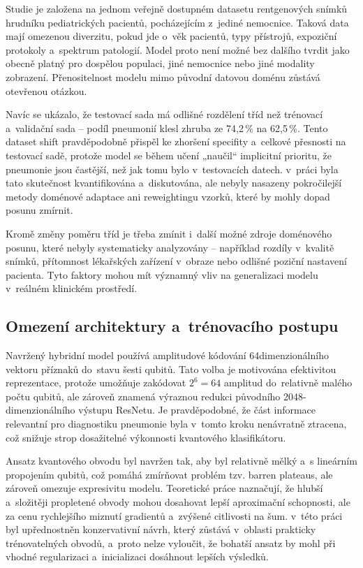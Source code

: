 \documentclass[12pt, a4paper]{report}
\begin{document}
Studie je založena na jednom veřejně dostupném datasetu rentgenových snímků hrudníku pediatrických pacientů, pocházejícím z~jediné nemocnice. Taková data mají omezenou diverzitu, pokud jde o~věk pacientů, typy přístrojů, expoziční protokoly a~spektrum patologií. Model proto není možné bez dalšího tvrdit jako obecně platný pro dospělou populaci, jiné nemocnice nebo jiné modality zobrazení. Přenositelnost modelu mimo původní datovou doménu zůstává otevřenou otázkou.

Navíc se ukázalo, že testovací sada má odlišné rozdělení tříd než trénovací a~validační sada – podíl pneumonií klesl zhruba ze 74{,}2\,\% na 62{,}5\,\%. Tento dataset shift pravděpodobně přispěl ke zhoršení specifity a~celkové přesnosti na testovací sadě, protože model se během učení „naučil“ implicitní prioritu, že pneumonie jsou častější, než jak tomu bylo v~testovacích datech. v~práci byla tato skutečnost kvantifikována a~diskutována, ale nebyly nasazeny pokročilejší metody doménové adaptace ani reweightingu vzorků, které by mohly dopad posunu zmírnit.

Kromě změny poměru tříd je třeba zmínit i~další možné zdroje doménového posunu, které nebyly systematicky analyzovány – například rozdíly v~kvalitě snímků, přítomnost lékařských zařízení v~obraze nebo odlišné poziční nastavení pacienta. Tyto faktory mohou mít významný vliv na generalizaci modelu v~reálném klinickém prostředí.

\subsection{Omezení architektury a~trénovacího postupu}

Navržený hybridní model používá amplitudové kódování 64dimenzionálního vektoru příznaků do~stavu šesti qubitů. Tato volba je motivována efektivitou reprezentace, protože umožňuje zakódovat $2^6 = 64$ amplitud do~relativně malého počtu qubitů, ale zároveň znamená výraznou redukci původního 2048-dimenzionálního výstupu ResNetu. Je pravděpodobné, že část informace relevantní pro diagnostiku pneumonie byla v~tomto kroku nenávratně ztracena, což snižuje strop dosažitelné výkonnosti kvantového klasifikátoru.

Ansatz kvantového obvodu byl navržen tak, aby byl relativně mělký a~s lineárním propojením qubitů, což pomáhá zmírňovat problém tzv. barren plateaus, ale zároveň omezuje expresivitu modelu. Teoretické práce naznačují, že hlubší a~složitěji propletené obvody mohou dosahovat lepší aproximační schopnosti, ale za cenu rychlejšího miznutí gradientů a~zvýšené citlivosti na šum. v~této práci byl upřednostněn konzervativní návrh, který zůstává v~oblasti prakticky trénovatelných obvodů, a~proto nelze vyloučit, že bohatší ansatz by mohl při vhodné regularizaci a~inicializaci dosáhnout lepších výsledků.
\end{document}
